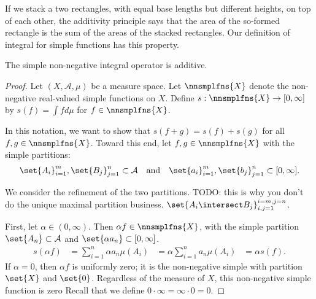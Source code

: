 


If we stack a two
rectangles, with equal
base lengths but different heights,
on top of each other, the
additivity principle
says that the
area of the so-formed
rectangle is
the sum of the areas
of the stacked rectangles.
Our definition of
integral for simple functions
has this property.


\begin{prop}

The simple non-negative
integral operator
is additive.

\begin{proof}

Let $(X, \mathcal{A}, \mu)$
be a measure space.
Let $\nnsmplfns{X}$ denote the
non-negative real-valued
simple functions on $X$.
Define
$s: \nnsmplfns{X} \to [0, \infty]$
by
$s(f) = \int f d\mu$
for
$f \in \nnsmplfns{X}$.

In this notation, we want to show
that
$s(f+g) = s(f) + s(g)$
for all
$f, g \in \nnsmplfns{X}$.
Toward this end, let $f,g \in \nnsmplfns{X}$
with the simple partitions:
\[
\set{A_i}_{i = 1}^{m},\set{B_j}_{j = 1}^{n} \subset \mathcal{A}
  \quad \text{and} \quad
\set{a_i}_{i = 1}^{m},\set{b_j}_{j = 1}^{n} \subset [0, \infty].
\]

We consider the refinement
of the two partitions.
TODO: this is why
you don't do the unique maximal
partition business.
$\set{A_i \intersect B_j}_{i, j = 1}^{i = m, j = n}$.


%

First, let
$\alpha \in (0, \infty)$.
Then $\alpha f \in \nnsmplfns{X}$,
with the simple partition
$\set{A_n} \subset \mathcal{A}$
and $\set{\alpha a_n} \subset [0, \infty]$.
\[
  \begin{aligned}
  s(\alpha f) &= \sum_{i = 1}^{n} \alpha a_n \mu(A_i)
              &= \alpha \sum_{i = 1}^{n} a_n \mu(A_i)
              &= \alpha s(f).
  \end{aligned}
\]
If $\alpha = 0$, then $\alpha f$ is uniformly
zero; it is the non-negative simple
with partition $\set{X}$ and $\set{0}$.
Regardless of the measure of $X$,
this non-negative simple function is zero
Recall that we define
$0 \cdot \infty = \infty \cdot 0 = 0$.
\end{proof}

\end{prop}
